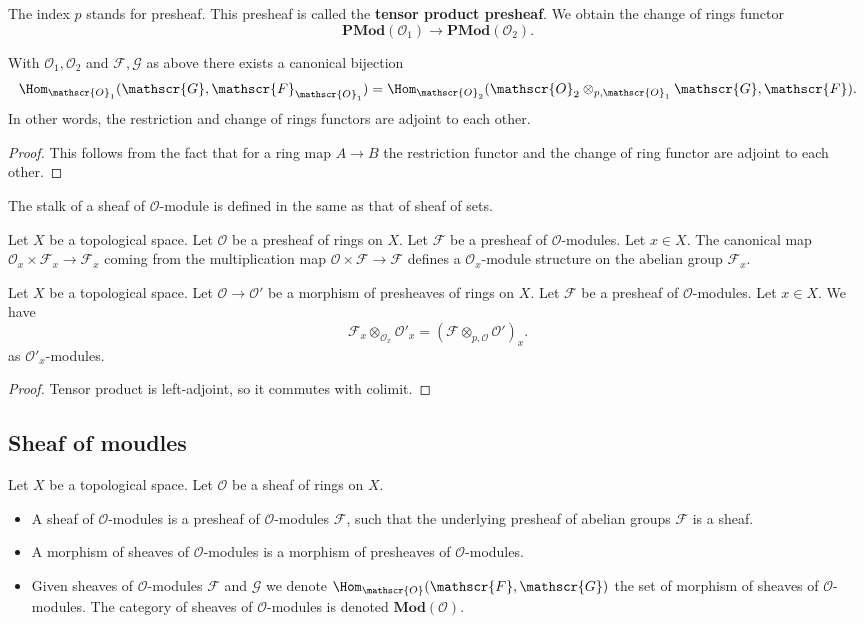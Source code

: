 The index $p$ stands for presheaf. This presheaf is called the \textbf{tensor product presheaf}. We obtain the change of rings functor
\[\mathbf{PMod}(\mathscr{O}_1)\to\mathbf{PMod}(\mathscr{O}_2).\]
\begin{proposition}\label{presheaf module restriction}
With $\mathscr{O}_1,\mathscr{O}_2$ and $\mathscr{F},\mathscr{G}$ as above there exists a canonical bijection
\[\Hom_{\mathscr{O}_1}(\mathscr{G},\mathscr{F}_{\mathscr{O}_1})=\Hom_{\mathscr{O}_2}(\mathscr{O}_2\otimes_{p,\mathscr{O}_1}\mathscr{G},\mathscr{F}).\]
In other words, the restriction and change of rings functors are adjoint to each other.
\end{proposition}
\begin{proof}
This follows from the fact that for a ring map $A\to B$ the restriction functor and the change of ring functor are adjoint to each other.
\end{proof}
The stalk of a sheaf of $\mathscr{O}$-module is defined in the same as that of sheaf of sets.
\begin{proposition}
Let $X$ be a topological space. Let $\mathscr{O}$ be a presheaf of rings on $X$. Let $\mathscr{F}$ be a presheaf of $\mathscr{O}$-modules. Let $x\in X$. The canonical map $\mathscr{O}_x\times\mathscr{F}_x\to\mathscr{F}_x$ coming from the multiplication map $\mathscr{O}\times\mathscr{F}\to\mathscr{F}$ defines a $\mathscr{O}_x$-module structure on the abelian group $\mathscr{F}_x$.
\end{proposition}
\begin{proposition}\label{ext module stalk pre}
Let $X$ be a topological space. Let $\mathscr{O}\to\mathscr{O}'$ be a morphism of presheaves of rings on $X$. Let $\mathscr{F}$ be a presheaf of $\mathscr{O}$-modules. Let $x\in X$. We have
\[\mathscr{F}_x\otimes_{\mathscr{O}_x}\mathscr{O}'_x=(\mathscr{F}\otimes_{p,\mathscr{O}}\mathscr{O}')_x.\]
as $\mathscr{O}'_x$-modules.
\end{proposition}
\begin{proof}
Tensor product is left-adjoint, so it commutes with colimit.
\end{proof}
\subsection{Sheaf of moudles}
\begin{definition}
Let $X$ be a topological space. Let $\mathscr{O}$ be a sheaf of rings on $X$.
\begin{itemize}
\item A sheaf of $\mathscr{O}$-modules is a presheaf of $\mathscr{O}$-modules $\mathscr{F}$, such that the underlying presheaf of abelian groups $\mathscr{F}$ is a sheaf.
\item A morphism of sheaves of $\mathscr{O}$-modules is a morphism of presheaves of $\mathscr{O}$-modules.
\item Given sheaves of $\mathscr{O}$-modules $\mathscr{F}$ and $\mathscr{G}$ we denote $\Hom_{\mathscr{O}}(\mathscr{F},\mathscr{G})$ the set of morphism of sheaves of $\mathscr{O}$-modules. The category of sheaves of $\mathscr{O}$-modules is denoted $\mathbf{Mod}(\mathscr{O})$.
\end{itemize}
\end{definition}

